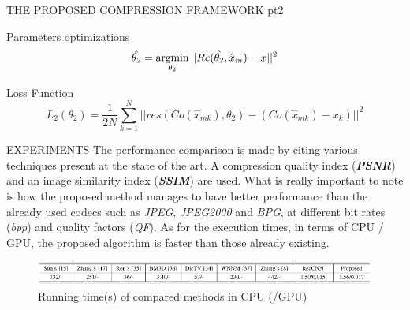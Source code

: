 \begin{frame}{THE PROPOSED COMPRESSION FRAMEWORK pt2}
\begin{minipage}{\linewidth}
\begin{minipage}{0.45\linewidth}
            \begin{block}{Parameters optimizations}
                \small $$ \hat{\theta_2} = \operatorname*{argmin}\limits_{\theta_2}||Re(\hat{\theta_2},\hat{x}_m)-x||^2 $$
            \end{block}
            \begin{block}{Loss Function}
                \tiny $$ L_2(\theta_2) = \frac{1}{2N}\sum_{k=1}^N||res(Co(\hat{x}_{mk}), \theta_2) - (Co(\hat{x}_{mk})-x_k)||^2 $$
             \end{block}
        \end{minipage}
    \end{minipage}
\end{frame}

\begin{frame}{EXPERIMENTS}
    The performance comparison is made by citing various techniques present 
    at the state of the art. A compression quality index ({\bfseries\emph{PSNR}}) and 
    an image similarity index ({\bfseries\emph{SSIM}}) are used. What is really important to note 
    is how the proposed method manages to have better performance than 
    the already used codecs such as \emph{JPEG}, \emph{JPEG2000} and \emph{BPG}, at different 
    bit rates (\emph{bpp}) and quality factors (\emph{QF}). As for the execution times, in 
    terms of CPU / GPU, the proposed algorithm is faster than those already 
    existing.
    \begin{figure}[htbp]
        \centering
        \includegraphics[width = 1 \linewidth]{images/paper3/time.png}
        \centering
        \caption{Running time(s) of compared methods in CPU (/GPU) }
        \label{fig:time}
    \end{figure}
\end{frame}

